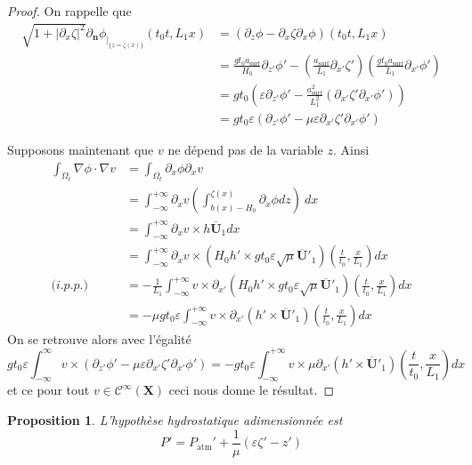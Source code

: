 \documentclass[12pt,a4paper]{article}
\newtheorem{prop}[dfn]{\textbf{Proposition}}
\numberwithin{equation}{section}
\begin{document}
\begin{proof}
    On rappelle que
    \begin{align}
        \sqrt{1+ |\partial_x\zeta|^2}\partial_\textbf{n}\phi_{|_{\{z = \zeta(x)\}}} (t_0t,L_1x) &= \left(\partial_z\phi -\partial_x\zeta\partial_x\phi\right) (t_0t,L_1x)\\
            &=\frac{gt_0a_{\text{surf}}}{H_0}\partial_{z'}\phi' - \left(\frac{a_{\text{surf}}}{L_1} 
            \partial_{x'} \zeta '\right)\left(\frac{gt_0a_{\text{surf}}}{L_1}\partial_{x'}\phi'\right)\\
            &=gt_0\left( \varepsilon\partial_{z'}\phi' - \frac{a_{\text{surf}}^2}{L_1^2}\left( \partial_{x'} \zeta '\partial_{x'}\phi'\right)\right)\\
            &=gt_0\varepsilon\left(\partial_{z'}\phi' -\mu\varepsilon \partial_{x'} \zeta '\partial_{x'}\phi'\right)
    \end{align}

    Supposons maintenant que $v$ ne dépend pas de la variable $z$. Ainsi
    \begin{equation}
        \begin{split}
            \int_{\Omega_t}{\nabla\phi \cdot \nabla v} &= \int_{\Omega_t}{\partial_x\phi \partial_xv}\\
            &= \int_{-\infty}^{+\infty} \partial_xv \left(\int_{b(x) - H_0}^{\zeta(x)}\partial_x\phi dz \right) ~dx\\
            &= \int_{-\infty}^{+\infty}\partial_xv \times h\overline{\textbf{U}}_1 dx\\
            &= \int_{-\infty}^{+\infty} \partial_xv \times \left(H_0h'\times gt_0\varepsilon\sqrt{\mu}\overline{\textbf{U}}'_1 \right)\left(\frac{t}{t_0},\frac{x}{L_1}\right)dx\\
            \textit{(i.p.p.)}~~~&= -\frac{1}{L_1}\int_{-\infty}^{+\infty} v \times \partial_{x'}\left(H_0h'\times gt_0\varepsilon\sqrt{\mu}\overline{\textbf{U}}'_1 \right)\left(\frac{t}{t_0},\frac{x}{L_1}\right)dx\\
            &= - \mu g t_0 \varepsilon\int_{-\infty}^{+\infty} v \times \partial_{x'}\left(h'\times \overline{\textbf{U}}'_1 \right)\left(\frac{t}{t_0},\frac{x}{L_1}\right)dx
        \end{split}
    \end{equation}
    On se retrouve alors avec l'égalité
    \begin{equation*}
         gt_0\varepsilon\int_{-\infty}^\infty v \times \left(\partial_{z'}\phi' -\mu\varepsilon \partial_{x'} \zeta '\partial_{x'}\phi'\right)= -g t_0 \varepsilon\int_{-\infty}^{+\infty} v \times \mu \partial_{x'}\left(h'\times \overline{\textbf{U}}'_1 \right)\left(\frac{t}{t_0},\frac{x}{L_1}\right)dx
    \end{equation*}
    et ce pour tout $v\in\mathcal{C}^\infty(\textbf{X})$ ceci nous donne le résultat.
\end{proof}
\begin{prop} \label{hydrostatic_hyp_adim}
    L'hypothèse hydrostatique adimensionnée est
    \begin{equation}
        P' = P_\text{atm}' + \frac{1}{\mu}(\varepsilon\zeta' - z')
    \end{equation}
\end{prop}
\end{document}
